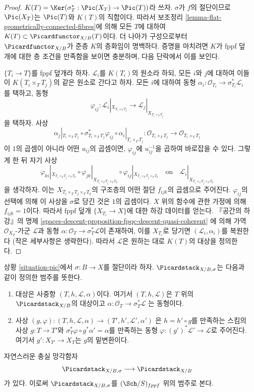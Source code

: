\begin{proof}
$K(T) = \Ker(\sigma_T^* : \Pic(X_T) \to \Pic(T))$라 쓰자.
$\sigma$가 $f$의 절단이므로 $\Pic(X_T)$는 $\Pic(T)$와 $K(T)$의 직합이다.
따라서 보조정리 \ref{lemma-flat-geometrically-connected-fibres}에 의해
모든 $T$에 대하여 $K(T) \subset \Picardfunctor_{X/B}(T)$이다.
더 나아가 구성으로부터 $\Picardfunctor_{X/B}$가 준층 $K$의 층화임이
명백하다. 증명을 마치려면 $K$가 fppf 덮개에 대한 층 조건을 만족함을
보이면 충분하며, 다음 단락에서 이를 보인다.

\medskip\noindent
$\{T_i \to T\}$를 fppf 덮개라 하자. $\mathcal{L}_i$를 $K(T_i)$의
원소라 하되, 모든 $i$와 $j$에 대하여 이들이
$K(T_i \times_T T_j)$의 같은 원소로 간다고 하자. 모든 $i$에 대하여 동형
$\alpha_i : \mathcal{O}_{T_i} \to \sigma_{T_i}^*\mathcal{L}_i$
를 택하고, 동형
$$
\varphi_{ij} :
\mathcal{L}_i|_{X_{T_i \times_T T_j}}
\longrightarrow
\mathcal{L}_j|_{X_{T_i \times_T T_j}}
$$
을 택하자. 사상
$$
\alpha_j|_{T_i \times_T T_j} \circ
\sigma_{T_i \times_T T_j}^*\varphi_{ij} \circ
\alpha_i|_{T_i \times_T T_j} :
\mathcal{O}_{T_i \times_T T_j} \to \mathcal{O}_{T_i \times_T T_j}
$$
이 $1$의 곱셈이 아니라 어떤 $u_{ij}$의 곱셈이면,
$\varphi_{ij}$에 $u_{ij}^{-1}$을 곱하여 바로잡을 수 있다.
그렇게 한 뒤 자기 사상
$$
\varphi_{ki}|_{X_{T_i \times_T T_j \times_T T_k}} \circ
\varphi_{jk}|_{X_{T_i \times_T T_j \times_T T_k}} \circ
\varphi_{ij}|_{X_{T_i \times_T T_j \times_T T_k}}
\quad\text{on}\quad
\mathcal{L}_i|_{X_{T_i \times_T T_j \times_T T_k}}
$$
을 생각하자. 이는 $X_{T_i \times_T T_j \times_T T_k}$의 구조층의 어떤 절단
$f_{ijk}$의 곱셈으로 주어진다. $\varphi_{ij}$의 선택에 의해 이 사상을
$\sigma$로 당긴 것은 $1$의 곱셈이다. $X$ 위의 함수에 관한 가정에 의해
$f_{ijk} = 1$이다. 따라서 fppf 덮개 $\{X_{T_i} \to X\}$에 대한
하강 데이터를 얻는다. 『공간의 하강』의 명제
\ref{spaces-descent-proposition-fpqc-descent-quasi-coherent}
에 의해 가역 $\mathcal{O}_{X_T}$-가군 $\mathcal{L}$과 동형
$\alpha : \mathcal{O}_T \to \sigma_T^*\mathcal{L}$이 존재하여, 이를
$X_{T_i}$로 당기면 $(\mathcal{L}_i, \alpha_i)$를 복원한다
(작은 세부사항은 생략한다). 따라서 $\mathcal{L}$은 원하는 대로
$K(T)$의 대상을 정의한다.
\end{proof}

\noindent
상황 \ref{situation-pic}에서 $\sigma : B \to X$를 절단이라 하자.
$\Picardstack_{X/B, \sigma}$는 다음과 같이 정의한 범주를 뜻한다.
\begin{enumerate}
\item 대상은 사중항 $(T, h, \mathcal{L}, \alpha)$이다. 여기서
$(T, h, \mathcal{L})$은 $T$ 위의 $\Picardstack_{X/B}$의 대상이고
$\alpha : \mathcal{O}_T \to \sigma_T^*\mathcal{L}$
는 동형이다.
\item 사상 $(g, \varphi) : (T, h, \mathcal{L}, \alpha)
\to (T', h', \mathcal{L}', \alpha')$
은 $h = h' \circ g$를 만족하는 스킴의 사상 $g : T \to T'$와
$\sigma_T^*\varphi \circ g^*\alpha' = \alpha$를 만족하는 동형
$\varphi : (g')^*\mathcal{L}' \to \mathcal{L}$로 주어진다.
여기서 $g' : X_{T'} \to X_T$는 $g$의 밑변환이다.
\end{enumerate}
자연스러운 충실 망각함자
$$
\Picardstack_{X/B, \sigma} \longrightarrow
\Picardstack_{X/B}
$$
가 있다. 이로써 $\Picardstack_{X/B, \sigma}$를
$(\Sch/S)_{fppf}$ 위의 범주로 본다.

